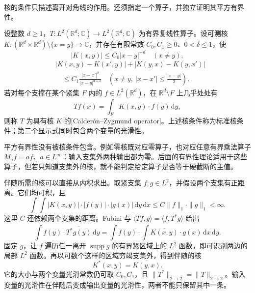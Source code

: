 核的条件只描述离开对角线的作用。还须指定一个算子，并独立证明其平方有界性。
\begin{definition}\label{b2:thm:18-cz-operator-definition}
设整数 \(d\geq1\)，\(T:L^2(\mathbb R^d;\mathbb C)\to L^2(\mathbb R^d;\mathbb C)\) 为有界复线性算子。设可测核 \(K:(\mathbb R^d\times\mathbb R^d)\setminus\{x=y\}\to\mathbb C\)，并存在有限常数 \(C_0,C_1\geq0\)、\(0<\delta\leq1\)，使
\[
 |K(x,y)|\leq C_0|x-y|^{-d}
 \quad(x\ne y),
\]
\[
 \begin{aligned}
 &|K(x,y)-K(x',y)|+|K(y,x)-K(y,x')|\\
 &\quad\leq C_1\frac{|x-x'|^\delta}{|x-y|^{d+\delta}}
 \quad\left(x\ne y,\ |x-x'|\leq\frac{|x-y|}2\right).
 \end{aligned}
\]
若对每个支撑在某个紧集 \(F\) 内的 \(f\in L^2(\mathbb R^d)\)，在 \(\mathbb R^d\setminus F\) 上几乎处处有
\[
 Tf(x)=\int_FK(x,y)\cdot f(y)\,\mathrm dy,
\]
则称 \(T\) 为具有核 \(K\) 的[Calderón--Zygmund operator]。上述核条件称为标准核条件；第二个显示式同时包含两个变量的光滑性。
\end{definition}

平方有界性没有被核条件包含。例如零核既对应零算子，也对应任意有界乘法算子 \(M_af=af\)、\(a\in L^\infty\)：输入支集外两种输出都为零。后面的有界性理论适用于这些算子，但若只知道支集外的核，就不能判定给定算子是否等于硬截断的主值。

\ProseParagraphBreak

伴随所需的核可以直接从内积求出。取紧支集 \(f,g\in L^2\)，并假设两个支集有正距离。它们均可积，且
\[
 \int\!\int |K(x,y)|\cdot|f(y)|\cdot|g(x)|\,\mathrm dy\,\mathrm dx
 \leq C\|f\|_1\cdot\|g\|_1<\infty.
\]
这里 \(C\) 还依赖两个支集的距离。Fubini 与 \(\langle Tf,g\rangle=\langle f,T^*g\rangle\) 给出
\[
 \int f(y)\cdot\overline{T^*g(y)}\,\mathrm dy
 =\int f(y)\cdot
       \overline{\int\overline{K(x,y)}\cdot g(x)\,\mathrm dx}\,\mathrm dy.
\]
固定 \(g\)，让 \(f\) 遍历任一离开 \(\operatorname{supp}g\) 的有界紧区域上的 \(L^2\) 函数，即可识别两边的局部 \(L^2\) 函数。再以可数个这样的区域穷竭支集外，得到伴随的核
\[
 K^*(x,y)=\overline{K(y,x)}.
\]
它的大小与两个变量光滑常数仍可取 \(C_0,C_1\)，且 \(\|T^*\|_{2\to2}=\|T\|_{2\to2}\)。输入变量的光滑性在伴随后变成输出变量的光滑性，两者不能只保留其中一条。

\ProseParagraphBreak

